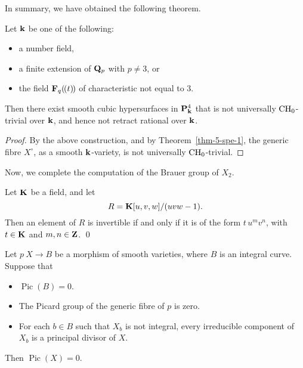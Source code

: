 In summary, we have obtained the following theorem.

\begin{theorem} \label{thm-6-cubic}
    Let $\bbk$ be one of the following:
    \begin{itemize}
        \item 
            a number field,
        \item
            a finite extension of $\bbQ_p$ with $p \neq 3$, or
        \item 
            the field $\bbF_q \doubleparen{t}$ of characteristic not equal to $3$.
    \end{itemize}
    Then there exist smooth cubic hypersurfaces in $\bbP_{\bbk}^4$
    that is not universally $\mathrm{CH}_0$-trivial over $\bbk$,
    and hence not retract rational over $\bbk$.
\end{theorem}

\begin{proof}
    By the above construction, and by Theorem~\ref{thm-5-spe-1},
    the generic fibre $X^\circ$, as a smooth $\bbk$-variety,
    is not universally $\mathrm{CH}_0$-trivial.
\end{proof}

Now, we complete the computation of the Brauer group of $X_2$.

\begin{lemma} \label{lem-6-invertible-functions}
    Let $\bbK$ be a field, and let
    \[ R = \bbK [u, v, w] / (uvw - 1). \]
    Then an element of $R$ is invertible if and only if it is of the form $t \, u^m v^n$,
    with $t \in \bbK$ and $m, n \in \bbZ$. \qed
\end{lemma}

\begin{lemma} \label{lem-6-pic}
    Let $p \: X \to B$ be a morphism of smooth varieties, where $B$ is an integral curve. Suppose that
    \begin{itemize}
        \item
            $\operatorname{Pic}(B) = 0$.
        \item
            The Picard group of the generic fibre of $p$ is zero.
        \item
            For each $b \in B$ such that $X_b$ is not integral, 
            every irreducible component of $X_b$ is a principal divisor of $X$.
    \end{itemize}
    Then $\operatorname{Pic}(X) = 0$.
\end{lemma}

